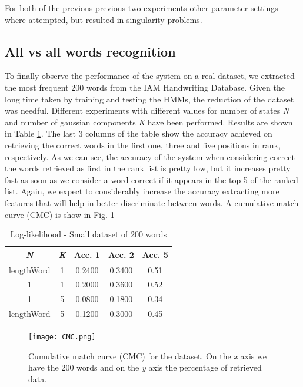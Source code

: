 \documentclass[conference]{IEEEtran}
\begin{document}
For both of the previous previous two experiments other parameter settings where attempted, but resulted in singularity problems.\\

\subsection{All vs all words recognition} \label{SubS:ALLvsALL}
To finally observe the performance of the system on a real dataset, we extracted the most frequent 200 words from the IAM Handwriting Database. Given the long time taken by training and testing the HMMs, the reduction of the dataset was needful. Different experiments with different values for number of states \textit{N} and number of gaussian components \textit{K} have been performed. Results are shown in Table \ref{Table:allvsall}. The last 3 columns of the table show the accuracy achieved on retrieving the correct words in the first one, three and five positions in rank, respectively. As we can see, the accuracy of the system when considering correct the words retrieved as first in the rank list is pretty low, but it increases pretty fast as soon as we consider a word correct if it appears in the top 5 of the ranked list. Again, we expect to considerably increase the accuracy extracting more features that will help in better discriminate between words. 
A cumulative match curve (CMC) is show in Fig. \ref{fig:cmc}

\begin{table}[H]
\centering
\caption{Log-likelihood - Small dataset of 200 words}
\label{Table:allvsall}
\begin{tabular}{|c|c|c|c|c|} \hline
 {\it N} & {\it K}  & Acc. 1 & Acc. 2 & Acc. 5 \\\hline
lengthWord & 1 &   0.2400 & 0.3400 & 0.51\\
1 & 1 &  0.2000 & 0.3600 & 0.52\\
1 & 5 & 0.0800 & 0.1800 & 0.34\\
lengthWord & 5 &  0.1200 & 0.3000 & 0.45 \\\hline
\end{tabular}
\end{table}



\begin{figure}
 \centering
\texttt{[image: CMC.png]}
\caption{Cumulative match curve (CMC) for the dataset. On the \textit{x} axis we have the 200 words and on the \textit{y} axis the percentage of retrieved data.}
\label{fig:cmc}
\end{figure}
\end{document}
